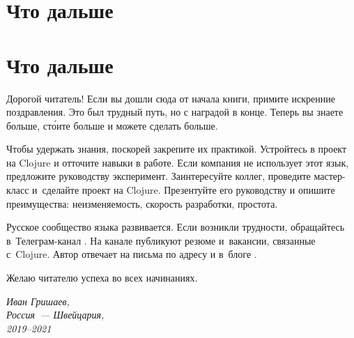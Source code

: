 
\ifprint
\chapter{Что дальше}
\else
\chapter*{Что дальше}
\fi

Дорогой читатель! Если вы дошли сюда от начала книги, примите искренние
поздравления. Это был трудный путь, но с наградой в конце. Теперь вы знаете
больше, ст\'{о}ите больше и можете сделать больше.

Чтобы удержать знания, поскорей закрепите их практикой. Устройтесь в проект на
Clojure и отточите навыки в работе. Если компания не использует этот язык,
предложите руководству эксперимент. Заинтересуйте коллег, проведите мастер-класс
и~сделайте проект на Clojure. Презентуйте его руководству и опишите
преимущества: неизменяемость, скорость разработки, простота.

Русское сообщество языка развивается. Если возникли трудности, обращайтесь
в~Телеграм-канал . На
канале  публикуют резюме
и~вакансии, связанные с~Clojure. Автор отвечает на письма по адресу
\EMAILLINK\xspace и в~блоге \SITELINK.

Желаю читателю успеха во всех начинаниях.

\vspace{1em}

\noindent

\hspace{\fill}\parbox{4cm}{\textit{Иван Гришаев,\\Россия~--- Швейцария,\\2019--2021}}
